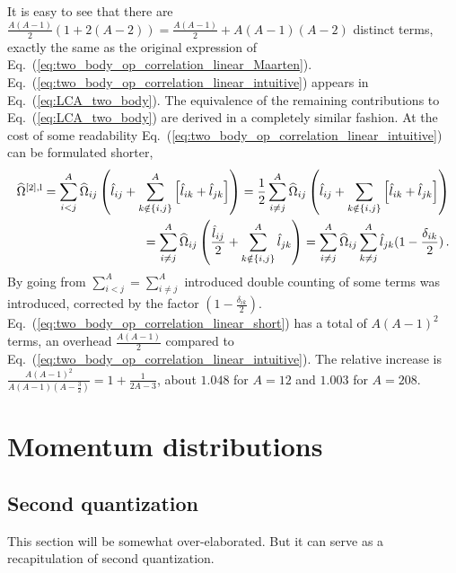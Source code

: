 \documentclass[10pt]{article}
\begin{document}
It is easy to see that there are $\frac{A(A-1)}{2}(1 + 2(A-2)) = \frac{A(A-1)}{2} + A(A-1)(A-2)$ distinct terms, exactly the same as the original expression of Eq.~(\ref{eq:two_body_op_correlation_linear_Maarten}).
Eq.~(\ref{eq:two_body_op_correlation_linear_intuitive}) appears in Eq.~(\ref{eq:LCA_two_body}). The equivalence of the remaining contributions to Eq.~(\ref{eq:LCA_two_body}) are derived in a completely similar fashion.
At the cost of some readability Eq.~(\ref{eq:two_body_op_correlation_linear_intuitive}) can be formulated shorter,
\begin{align}
	\widehat{\Omega}^{[2],\text{l}} =
	\sum_{i<j}^{A} \widehat{\Omega}_{ij}  \left( \hat{l}_{ij} + 
	\sum_{k \notin\{i,j\}}^{A}
	\left[ 
	\hat{l}_{ik} + \hat{l}_{jk} 
	\right]	
	\right) = \frac{1}{2}\sum_{i \neq j}^{A} \widehat{\Omega}_{ij}  \left( \hat{l}_{ij} + 
	\sum_{k \notin\{i,j\}}
	\left[ 
	\hat{l}_{ik} + \hat{l}_{jk} 
	\right]	
	\right) \notag \\
	= \sum_{i \neq j}^{A} \widehat{\Omega}_{ij}  \left( \frac{\hat{l}_{ij}}{2} + 
	\sum_{k \notin\{i,j\}}^{A} \hat{l}_{jk}
	\right) =
	\sum_{i \neq j}^{A} \widehat{\Omega}_{ij} 
	\sum_{k \neq j}^{A} \hat{l}_{jk} ( 1 - \frac{\delta_{ik}}{2}) \, .
	\label{eq:two_body_op_correlation_linear_short}
\end{align}
By going from $ \sum_{i<j}^{A} = \sum_{i \neq j}^{A}$ introduced double counting of some terms was introduced, corrected by the factor $( 1 - \frac{\delta_{ik}}{2})$. Eq.~(\ref{eq:two_body_op_correlation_linear_short}) has a total of $A(A-1)^{2}$ terms, an overhead $\frac{A(A-1)}{2}$ compared to Eq.~(\ref{eq:two_body_op_correlation_linear_intuitive}). The relative increase is $ \frac{A(A-1)^{2}}{A(A-1)(A-\frac{3}{2})} = 1 + \frac{1}{2A-3}$, about $1.048$ for $A=12$ and $1.003$ for $A=208$.
\section{Momentum distributions}
\subsection{Second quantization}
This section will be somewhat over-elaborated. But it can serve as a recapitulation of second quantization.
\end{document}
